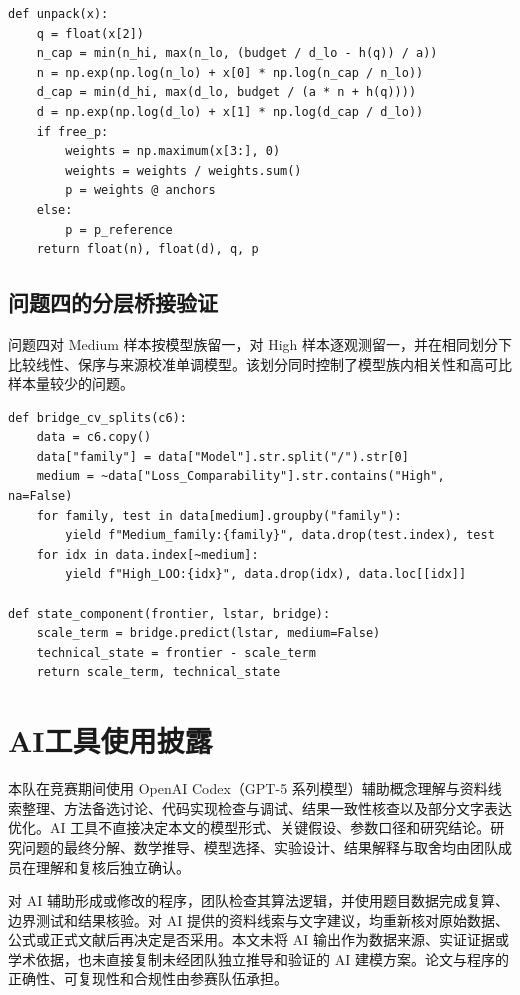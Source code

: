 \documentclass[bwprint]{gmcmthesis}
\begin{document}
\begin{appendices}
    \begin{lstlisting}[style=appendixcode]
def unpack(x):
    q = float(x[2])
    n_cap = min(n_hi, max(n_lo, (budget / d_lo - h(q)) / a))
    n = np.exp(np.log(n_lo) + x[0] * np.log(n_cap / n_lo))
    d_cap = min(d_hi, max(d_lo, budget / (a * n + h(q))))
    d = np.exp(np.log(d_lo) + x[1] * np.log(d_cap / d_lo))
    if free_p:
        weights = np.maximum(x[3:], 0)
        weights = weights / weights.sum()
        p = weights @ anchors
    else:
        p = p_reference
    return float(n), float(d), q, p
\end{lstlisting}

    \subsection{问题四的分层桥接验证}

    问题四对 Medium 样本按模型族留一，对 High 样本逐观测留一，并在相同划分下比较线性、保序与来源校准单调模型。该划分同时控制了模型族内相关性和高可比样本量较少的问题。

    \begin{lstlisting}[style=appendixcode]
def bridge_cv_splits(c6):
    data = c6.copy()
    data["family"] = data["Model"].str.split("/").str[0]
    medium = ~data["Loss_Comparability"].str.contains("High", na=False)
    for family, test in data[medium].groupby("family"):
        yield f"Medium_family:{family}", data.drop(test.index), test
    for idx in data.index[~medium]:
        yield f"High_LOO:{idx}", data.drop(idx), data.loc[[idx]]

def state_component(frontier, lstar, bridge):
    scale_term = bridge.predict(lstar, medium=False)
    technical_state = frontier - scale_term
    return scale_term, technical_state
\end{lstlisting}

    \clearpage
    \section{AI工具使用披露}

    本队在竞赛期间使用 OpenAI Codex（GPT-5 系列模型）辅助概念理解与资料线索整理、方法备选讨论、代码实现检查与调试、结果一致性核查以及部分文字表达优化。AI 工具不直接决定本文的模型形式、关键假设、参数口径和研究结论。研究问题的最终分解、数学推导、模型选择、实验设计、结果解释与取舍均由团队成员在理解和复核后独立确认。

    对 AI 辅助形成或修改的程序，团队检查其算法逻辑，并使用题目数据完成复算、边界测试和结果核验。对 AI 提供的资料线索与文字建议，均重新核对原始数据、公式或正式文献后再决定是否采用。本文未将 AI 输出作为数据来源、实证证据或学术依据，也未直接复制未经团队独立推导和验证的 AI 建模方案。论文与程序的正确性、可复现性和合规性由参赛队伍承担。

\end{appendices}
\end{document}
